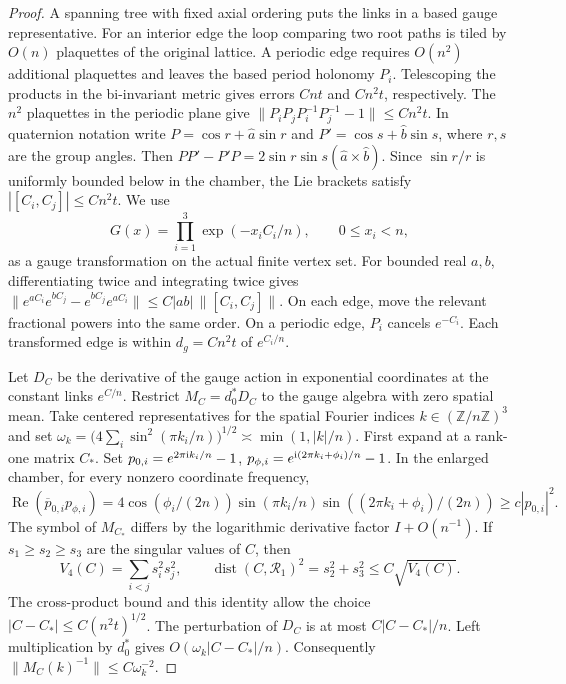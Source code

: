 \documentclass[11pt,a4paper]{article}
\numberwithin{equation}{section}
\begin{document}
\begin{proof}
A spanning tree with fixed axial ordering puts the links in a based gauge representative. For an interior edge the loop comparing two root paths is tiled by \(O(n)\) plaquettes of the original lattice. A periodic edge requires \(O(n^2)\) additional plaquettes and leaves the based period holonomy \(P_i\). Telescoping the products in the bi-invariant metric gives errors \(Cnt\) and \(Cn^2t\), respectively. The \(n^2\) plaquettes in the periodic plane give \(\|P_iP_jP_i^{-1}P_j^{-1}-1\|\le Cn^2t\). In quaternion notation write \(P=\cos r+\widehat a\sin r\) and \(P'=\cos s+\widehat b\sin s\), where \(r,s\) are the group angles. Then \(PP'-P'P=2\sin r\sin s(\widehat a\times\widehat b)\). Since \(\sin r/r\) is uniformly bounded below in the chamber, the Lie brackets satisfy \(|[C_i,C_j]|\le Cn^2t\). We use
\[
 G(x)=\prod_{i=1}^3\exp(-x_iC_i/n),\qquad 0\le x_i<n,
\]
as a gauge transformation on the actual finite vertex set. For bounded real \(a,b\), differentiating twice and integrating twice gives
\(\|e^{aC_i}e^{bC_j}-e^{bC_j}e^{aC_i}\|\le C|ab|\,\|[C_i,C_j]\|\).
On each edge, move the relevant fractional powers into the same order. On a periodic edge, \(P_i\) cancels \(e^{-C_i}\). Each transformed edge is within \(d_g=Cn^2t\) of \(e^{C_i/n}\).

Let \(D_C\) be the derivative of the gauge action in exponential coordinates at the constant links \(e^{C/n}\). Restrict \(M_C=d_0^*D_C\) to the gauge algebra with zero spatial mean. Take centered representatives for the spatial Fourier indices \(k\in(\mathbb Z/n\mathbb Z)^3\) and set \(\omega_k=\big(4\sum_i\sin^2(\pi k_i/n)\big)^{1/2}\asymp\min(1,|k|/n)\). First expand at a rank-one matrix \(C_*\). Set
\(p_{0,i}=e^{2\pi {\rm i} k_i/n}-1\),
\(p_{\phi,i}=e^{{\rm i}(2\pi k_i+\phi_i)/n}-1\).
In the enlarged chamber, for every nonzero coordinate frequency,
\[
 \operatorname{Re}(\overline p_{0,i}p_{\phi,i})
 =4\cos(\phi_i/(2n))\sin(\pi k_i/n)
                 \sin((2\pi k_i+\phi_i)/(2n))
 \ge c|p_{0,i}|^2 .
\]
The symbol of \(M_{C_*}\) differs by the logarithmic derivative factor \(I+O(n^{-1})\). If \(s_1\ge s_2\ge s_3\) are the singular values of \(C\), then
\begin{equation}
 V_4(C)=\sum_{i<j}s_i^2s_j^2,\qquad
 \operatorname{dist}(C,\mathcal R_1)^2=s_2^2+s_3^2
 \le C\sqrt{V_4(C)}.                                     \label{eq:cam-soft-minors-bound}
\end{equation}
The cross-product bound and this identity allow the choice \(|C-C_*|\le C(n^2t)^{1/2}\). The perturbation of \(D_C\) is at most \(C|C-C_*|/n\). Left multiplication by \(d_0^*\) gives \(O(\omega_k|C-C_*|/n)\). Consequently \(\|M_C(k)^{-1}\|\le C\omega_k^{-2}\).


\end{proof}
\end{document}
